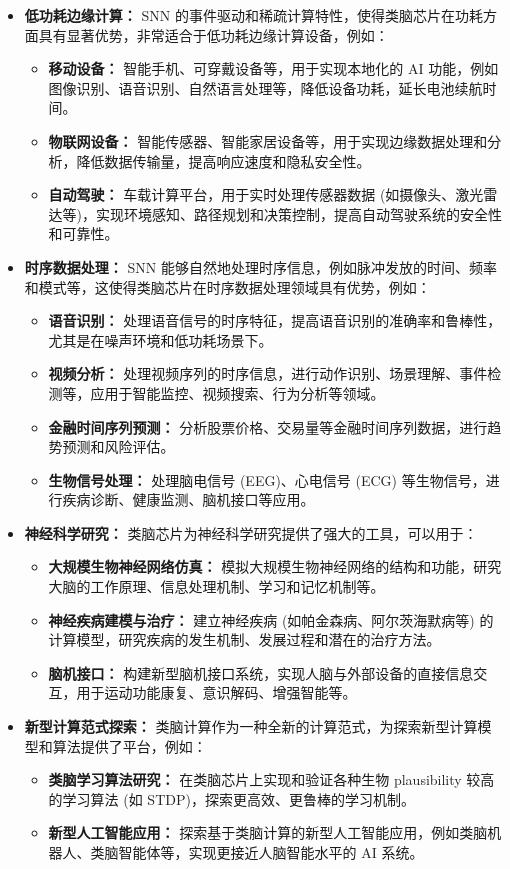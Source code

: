 \documentclass[12pt, a4paper, oneside]{ctexart}
\numberwithin{equation}{section}  %
\begin{document}
\begin{itemize}
    \item \textbf{低功耗边缘计算：} SNN 的事件驱动和稀疏计算特性，使得类脑芯片在功耗方面具有显著优势，非常适合于低功耗边缘计算设备，例如：
    \begin{itemize}
        \item \textbf{移动设备：} 智能手机、可穿戴设备等，用于实现本地化的 AI 功能，例如图像识别、语音识别、自然语言处理等，降低设备功耗，延长电池续航时间。
        \item \textbf{物联网设备：} 智能传感器、智能家居设备等，用于实现边缘数据处理和分析，降低数据传输量，提高响应速度和隐私安全性。
        \item \textbf{自动驾驶：} 车载计算平台，用于实时处理传感器数据 (如摄像头、激光雷达等)，实现环境感知、路径规划和决策控制，提高自动驾驶系统的安全性和可靠性。
    \end{itemize}
    \item \textbf{时序数据处理：} SNN 能够自然地处理时序信息，例如脉冲发放的时间、频率和模式等，这使得类脑芯片在时序数据处理领域具有优势，例如：
    \begin{itemize}
        \item \textbf{语音识别：} 处理语音信号的时序特征，提高语音识别的准确率和鲁棒性，尤其是在噪声环境和低功耗场景下。
        \item \textbf{视频分析：} 处理视频序列的时序信息，进行动作识别、场景理解、事件检测等，应用于智能监控、视频搜索、行为分析等领域。
        \item \textbf{金融时间序列预测：} 分析股票价格、交易量等金融时间序列数据，进行趋势预测和风险评估。
        \item \textbf{生物信号处理：} 处理脑电信号 (EEG)、心电信号 (ECG) 等生物信号，进行疾病诊断、健康监测、脑机接口等应用。
    \end{itemize}
    \item \textbf{神经科学研究：} 类脑芯片为神经科学研究提供了强大的工具，可以用于：
    \begin{itemize}
        \item \textbf{大规模生物神经网络仿真：} 模拟大规模生物神经网络的结构和功能，研究大脑的工作原理、信息处理机制、学习和记忆机制等。
        \item \textbf{神经疾病建模与治疗：} 建立神经疾病 (如帕金森病、阿尔茨海默病等) 的计算模型，研究疾病的发生机制、发展过程和潜在的治疗方法。
        \item \textbf{脑机接口：} 构建新型脑机接口系统，实现人脑与外部设备的直接信息交互，用于运动功能康复、意识解码、增强智能等。
    \end{itemize}
    \item \textbf{新型计算范式探索：} 类脑计算作为一种全新的计算范式，为探索新型计算模型和算法提供了平台，例如：
    \begin{itemize}
        \item \textbf{类脑学习算法研究：} 在类脑芯片上实现和验证各种生物 plausibility 较高的学习算法 (如 STDP)，探索更高效、更鲁棒的学习机制。
        \item \textbf{新型人工智能应用：} 探索基于类脑计算的新型人工智能应用，例如类脑机器人、类脑智能体等，实现更接近人脑智能水平的 AI 系统。
    \end{itemize}
\end{itemize}
\end{document}
